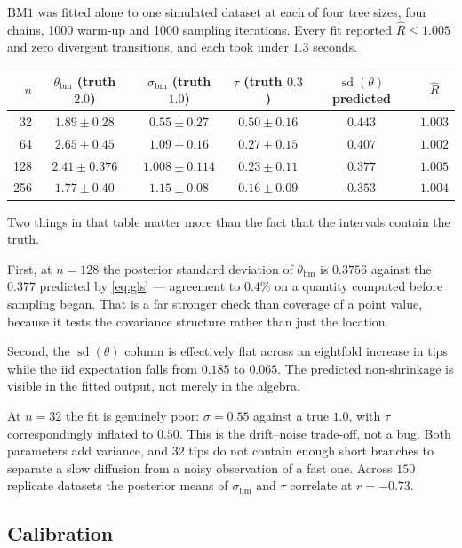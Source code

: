 \documentclass[11pt]{article}
\newcommand{\BM}{\mathrm{BM1}}
\begin{document}
$\BM$ was fitted alone to one simulated dataset at each of four tree sizes, four chains, 1000
warm-up and 1000 sampling iterations. Every fit reported $\hat{R} \le 1.005$ and zero divergent
transitions, and each took under $1.3$ seconds.

\begin{center}
\begin{tabular}{@{}rccccc@{}}
\toprule
$n$ & $\theta_{\mathrm{bm}}$ (truth $2.0$) & $\sigma_{\mathrm{bm}}$ (truth $1.0$) & $\tau$ (truth $0.3$)
  & $\operatorname{sd}(\theta)$ predicted & $\hat{R}$ \\
\midrule
 32 & $1.89 \pm 0.28$ & $0.55 \pm 0.27$ & $0.50 \pm 0.16$ & $0.443$ & $1.003$ \\
 64 & $2.65 \pm 0.45$ & $1.09 \pm 0.16$ & $0.27 \pm 0.15$ & $0.407$ & $1.002$ \\
128 & $2.41 \pm 0.376$ & $1.008 \pm 0.114$ & $0.23 \pm 0.11$ & $\mathbf{0.377}$ & $1.005$ \\
256 & $1.77 \pm 0.40$ & $1.15 \pm 0.08$ & $0.16 \pm 0.09$ & $0.353$ & $1.004$ \\
\bottomrule
\end{tabular}
\end{center}

Two things in that table matter more than the fact that the intervals contain the truth.

First, at $n = 128$ the posterior standard deviation of $\theta_{\mathrm{bm}}$ is $0.3756$ against the
$0.377$ predicted by \eqref{eq:gls} --- agreement to $0.4\%$ on a quantity computed before sampling
began. That is a far stronger check than coverage of a point value, because it tests the covariance
structure rather than just the location.

Second, the $\operatorname{sd}(\theta)$ column is effectively flat across an eightfold increase in
tips while the iid expectation falls from $0.185$ to $0.065$. The predicted non-shrinkage is visible
in the fitted output, not merely in the algebra.

At $n = 32$ the fit is genuinely poor: $\sigma = 0.55$ against a true $1.0$, with $\tau$
correspondingly inflated to $0.50$. This is the drift--noise trade-off, not a bug. Both parameters
add variance, and $32$ tips do not contain enough short branches to separate a slow diffusion from a
noisy observation of a fast one. Across $150$ replicate datasets the posterior means of
$\sigma_{\mathrm{bm}}$ and $\tau$ correlate at $r = -0.73$.

\subsection*{Calibration}
\end{document}
